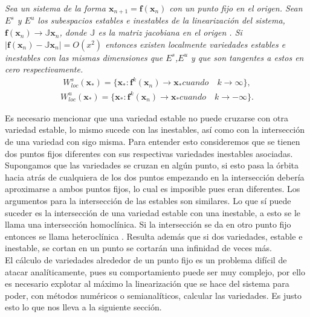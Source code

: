 \begin{thm}
\textit{Sea un sistema de la forma $\mathbf{x}_{n+1}=\mathbf{f}(\mathbf{x}_{n})$ con un punto fijo en el origen. Sean $E^{s}$ y $E^{u}$ los subespacios estables e inestables de la linearización del sistema,$\mathbf{f}(\mathbf{x}_{n})\rightarrow\mathbb{J}\mathbf{x}_{n}$,  donde $\mathbb{J}$ es la matriz jacobiana en el origen . Si $\mid \mathbf{f}(\mathbf{x}_{n})-\mathbb{J}\mathbf{x}_{n}\mid =O(x^{2})$ entonces existen localmente variedades estables e inestables con las mismas dimensiones que $E^{s}$,$E^{u}$ y que son tangentes a estos en cero respectivamente.}
\begin{eqnarray*}
W^{s}_{loc}(\mathbf{x}_{*})= \lbrace \mathbf{x}_{*} : \mathbf{f}^{k}(\mathbf{x}_{n})\rightarrow \mathbf{x}_{*} cuando\quad k \rightarrow \infty \rbrace,
\end{eqnarray*}
\begin{eqnarray*}
W^{u}_{loc}(\mathbf{x}_{*}) = \lbrace \mathbf{x}_{*} : \mathbf{f}^{k}(\mathbf{x}_{n})\rightarrow \mathbf{x}_{*} cuando\quad k \rightarrow -\infty \rbrace.
\end{eqnarray*}
\end{thm}

Es necesario mencionar que una variedad estable no puede cruzarse con otra variedad estable, lo mismo sucede con las inestables, así como con la intersección de una variedad con sigo misma. Para entender esto consideremos que se tienen dos puntos fijos diferentes con sus respectivas variedades inestables asociadas. Supongamos que las variedades se cruzan en algún punto, si esto pasa la órbita hacia atrás de cualquiera de los dos puntos empezando en la intersección debería aproximarse a ambos puntos fijos, lo cual es imposible pues eran diferentes. Los argumentos para la intersección de las estables son similares. Lo que sí puede suceder es la intersección de una variedad estable con una inestable, a esto se le llama una intersección homoclínica. Si la intersección se da en otro punto fijo entonces se llama heteroclínica \cite{Ott}. Resulta además que si dos variedades, estable e inestable, se cortan en un punto se cortarán una infinidad de veces más. \\


El cálculo de variedades alrededor de un punto fijo es un problema difícil de atacar analíticamente, pues su comportamiento puede ser muy complejo, por ello es necesario explotar al máximo la linearización que se hace del sistema para poder, con métodos numéricos o semianalíticos, calcular las variedades. Es justo esto lo que nos lleva a la siguiente sección.




